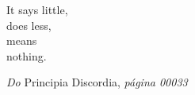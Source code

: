 \cleardoublepage
\begin{center}
\vspace*{\fill}
\begin{flushright}
{\large\foreignlanguage{english}{It says little,\\
does less, \\
means \\
nothing.} \\}

{\tiny \emph{Do} Principia Discordia, \emph{página 00033}}
\end{flushright}
\end{center}
\cleardoublepage
